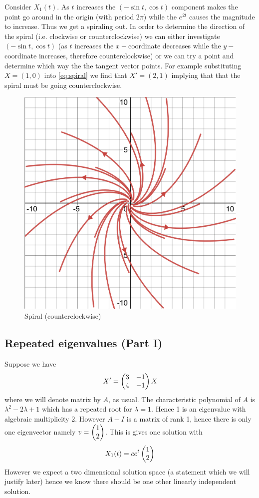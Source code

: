Consider $X_1(t)$. As $t$ increases the $(-\sin t, \cos t)$ component makes the point go around in the origin (with period $2\pi$) while the $e^{2t}$ causes the magnitude to increase. Thus we get a spiraling out. In order to determine the direction of the spiral (i.e. clockwise or counterclockwise) we can either investigate $(-\sin t, \cos t)$ (as $t$ increases the $x-$coordinate decreases while the $y-$coordinate increases, therefore counterclockwise) or we can try a point and determine which way the the tangent vector points. For example substituting $X = (1, 0)$ into \autoref{eq:spiral} we find that $X' = (2, 1)$ implying that that the spiral must be going counterclockwise.


\begin{figure}[h]
    \centering
    \includegraphics[scale=0.25]{Images/spiral.png}
    \caption{Spiral (counterclockwise)}
    \label{fig:sprial-cc}
\end{figure}

\subsection{Repeated eigenvalues (Part I)}
Suppose we have
\begin{equation}
    X' = \begin{pmatrix} 3 & -1\\4 & -1 \end{pmatrix} X
\end{equation}
where we will denote matrix by $A$, as usual. The characteristic polynomial of $A$ is $\lambda^2 - 2\lambda + 1$ which has a repeated root for $\lambda = 1$. Hence 1 is an eigenvalue with algebraic multiplicity 2. However $A - I$ is a matrix of rank 1, hence there is only one eigenvector namely $v = \begin{pmatrix} 1\\2 \end{pmatrix}$. This is gives one solution with
$$ X_1(t) = c e^{t} \begin{pmatrix} 1\\2 \end{pmatrix} $$
However we expect a two dimensional solution space (a statement which we will justify later) hence we know there should be one other linearly independent solution.

